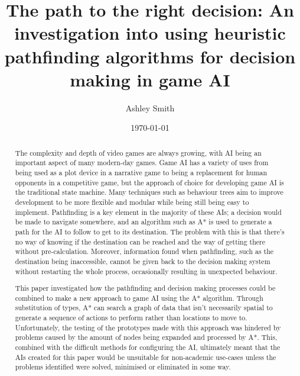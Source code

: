\documentclass[11pt, a4paper]{report}
\begin{document}
\title{\titlefont The path to the right decision: An investigation into using heuristic pathfinding algorithms for decision making in game AI}
\author{Ashley Smith}
\date{\today}
\maketitle
\thispagestyle{empty}

\renewcommand\abstractname{\textbf{Abstract}}
\begin{abstract}
The complexity and depth of video games are always growing, with AI being an important aspect of many modern-day games. Game AI has a variety of uses from being used as a plot device in a narrative game to being a replacement for human opponents in a competitive game, but the approach of choice for developing game AI is the traditional state machine. Many techniques such as behaviour trees aim to improve development to be more flexible and modular while being still being easy to implement. Pathfinding is a key element in the majority of these AIs; a decision would be made to navigate somewhere, and an algorithm such as A* is used to generate a path for the AI to follow to get to its destination. The problem with this is that there's no way of knowing if the destination can be reached and the way of getting there without pre-calculation. Moreover, information found when pathfinding, such as the destination being inaccessible, cannot be given back to the decision making system without restarting the whole process, occasionally resulting in unexpected behaviour. 

This paper investigated how the pathfinding and decision making processes could be combined to make a new approach to game AI using the A* algorithm. Through substitution of types, A* can search a graph of data that isn't necessarily spatial to generate a sequence of actions to perform rather than locations to move to. Unfortunately, the testing of the prototypes made with this approach was hindered by problems caused by the amount of nodes being expanded and processed by A*. This, combined with the difficult methods for configuring the AI, ultimately meant that the AIs created for this paper would be unsuitable for non-academic use-cases unless the problems identified were solved, minimised or eliminated in some way.
\end{abstract}

\cleardoublepage
\setcounter{page}{1}
\tableofcontents

\cleardoublepage
{}
\setcounter{page}{1}
\end{document}
